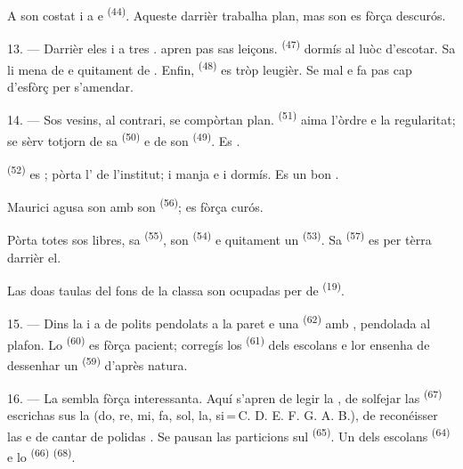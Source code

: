 A son costat i a  e  \textsuperscript{(44)}.
Aqueste darrièr trabalha plan, mas son  es fòrça descurós.

13. --- Darrièr eles i a tres .  apren pas sas
leiçons.  \textsuperscript{(47)} dormís al luòc d'escotar. Sa
 li mena de  e quitament de
. Enfin,  \textsuperscript{(48)} es tròp
leugièr. Se  mal e fa pas cap d'esfòrç per s'amendar.

14. --- Sos vesins, al contrari, se compòrtan plan. 
\textsuperscript{(51)} aima l'òrdre e la regularitat; se sèrv totjorn de sa
 \textsuperscript{(50)} e de son 
\textsuperscript{(49)}. Es .

 \textsuperscript{(52)} es ; pòrta
l' de l'institut; i manja e i dormís. Es un bon
.

Maurici agusa son  amb son 
\textsuperscript{(56)}; es fòrça curós.

Pòrta totes sos libres, sa  \textsuperscript{(55)}, son
 \textsuperscript{(54)} e quitament un
 \textsuperscript{(53)}. Sa 
\textsuperscript{(57)} es per tèrra darrièr el.

Las doas taulas del fons de la classa son ocupadas per de 
\textsuperscript{(19)}.

\VUsaut{4.6mm}
\VUsaut{3.4mm}

15. --- Dins la  i a de polits  pendolats
a la paret e una  \textsuperscript{(62)} amb ,
pendolada al plafon. Lo  \textsuperscript{(60)} es fòrça
pacient; corregís los  \textsuperscript{(61)} dels escolans e lor
ensenha de dessenhar un  \textsuperscript{(59)} d'après natura.

16. --- La  sembla fòrça interessanta. Aquí s'apren de
legir la , de solfejar las 
\textsuperscript{(67)} escrichas sus la  (do, re, mi, fa, sol, la,
si\,=\,C. D. E. F. G. A. B.), de reconéisser las  e de cantar de
polidas . Se pausan las particions sul 
\textsuperscript{(65)}. Un dels escolans 
\textsuperscript{(64)} e lo  \textsuperscript{(66)}
 \textsuperscript{(68)}.

